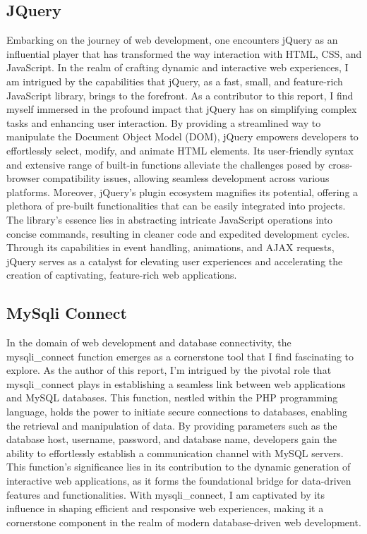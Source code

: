 \subsection{JQuery}
Embarking on the journey of web development, one encounters jQuery as an influential player that has transformed the way interaction with HTML, CSS, and JavaScript. In the realm of crafting dynamic and interactive web experiences, I am intrigued by the capabilities that jQuery, as a fast, small, and feature-rich JavaScript library, brings to the forefront. As a contributor to this report, I find myself immersed in the profound impact that jQuery has on simplifying complex tasks and enhancing user interaction. By providing a streamlined way to manipulate the Document Object Model (DOM), jQuery empowers developers to effortlessly select, modify, and animate HTML elements. Its user-friendly syntax and extensive range of built-in functions alleviate the challenges posed by cross-browser compatibility issues, allowing seamless development across various platforms. Moreover, jQuery's plugin ecosystem magnifies its potential, offering a plethora of pre-built functionalities that can be easily integrated into projects. The library's essence lies in abstracting intricate JavaScript operations into concise commands, resulting in cleaner code and expedited development cycles. Through its capabilities in event handling, animations, and AJAX requests, jQuery serves as a catalyst for elevating user experiences and accelerating the creation of captivating, feature-rich web applications.
\subsection{MySqli Connect}
In the domain of web development and database connectivity, the mysqli\_connect function emerges as a cornerstone tool that I find fascinating to explore. As the author of this report, I'm intrigued by the pivotal role that mysqli\_connect plays in establishing a seamless link between web applications and MySQL databases. This function, nestled within the PHP programming language, holds the power to initiate secure connections to databases, enabling the retrieval and manipulation of data. By providing parameters such as the database host, username, password, and database name, developers gain the ability to effortlessly establish a communication channel with MySQL servers. This function's significance lies in its contribution to the dynamic generation of interactive web applications, as it forms the foundational bridge for data-driven features and functionalities. With mysqli\_connect, I am captivated by its influence in shaping efficient and responsive web experiences, making it a cornerstone component in the realm of modern database-driven web development.
